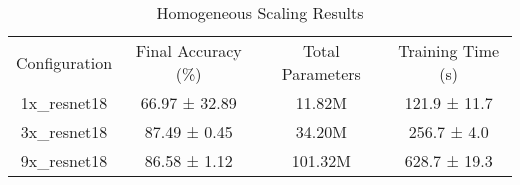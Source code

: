 \begin{table}
    \centering
    \begin{tabular}{cccc}
        Configuration & Final Accuracy (\%) & Total Parameters & Training Time (s) \\
        1x_resnet18 & 66.97 ± 32.89 & 11.82M & 121.9 ± 11.7 \\
        3x_resnet18 & 87.49 ± 0.45 & 34.20M & 256.7 ± 4.0 \\
        9x_resnet18 & 86.58 ± 1.12 & 101.32M & 628.7 ± 19.3 \\
    \end{tabular}
    \caption{Homogeneous Scaling Results}
    \label{tab:homogeneous_scale}
\end{table}